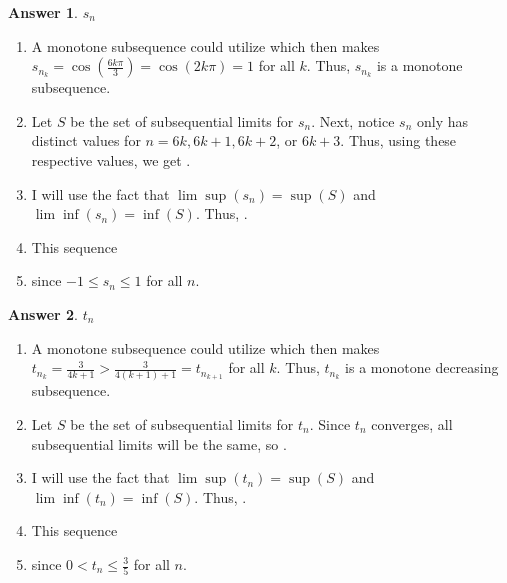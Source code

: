 \documentclass[10pt,a4paper]{article}
\theoremstyle{definition}
\newtheorem*{answer*}{Answer}
\begin{document}
\begin{answer*}{$s_n$}
\begin{enumerate}[label = (\alph*)]
\item A monotone subsequence could utilize  which then makes $s_{n_k} = \cos\left(\frac{6k \pi}{3}\right) = \cos(2k \pi) = 1$ for all $k$. Thus, $s_{n_k}$ is a monotone subsequence.
\item Let $S$ be the set of subsequential limits for $s_n$. Next, notice $s_n$ only has distinct values for $n = 6k, 6k + 1, 6k + 2$, or $6k + 3$. Thus, using these respective values, we get .
\item I will use the fact that $\lim \sup(s_n) = \sup(S)$ and $\lim \inf(s_n) = \inf(S)$. Thus, .
\item This sequence 
\item {} since $-1 \leq s_n \leq 1$ for all $n$.
\end{enumerate}
\end{answer*}

\begin{answer*}{$t_n$}
\begin{enumerate}[label = (\alph*)]
\item A monotone subsequence could utilize  which then makes $t_{n_k} = \frac{3}{4k + 1} > \frac{3}{4(k+1) + 1} = t_{n_{k+1}}$ for all $k$. Thus, $t_{n_k}$ is a monotone decreasing subsequence.
\item Let $S$ be the set of subsequential limits for $t_n$. Since $t_n$ converges, all subsequential limits will be the same, so .
\item I will use the fact that $\lim \sup(t_n) = \sup(S)$ and $\lim \inf(t_n) = \inf(S)$. Thus, .
\item This sequence 
\item {} since $0 < t_n \leq \frac{3}{5}$ for all $n$.
\end{enumerate}
\end{answer*}
\end{document}
